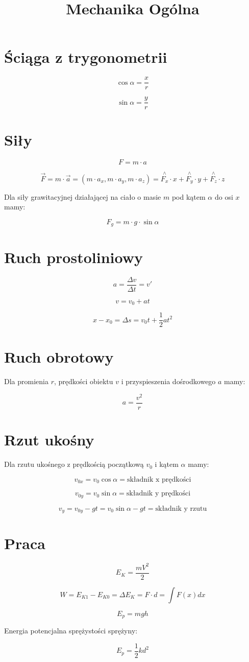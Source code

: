 \documentclass{../notatki}
\title{Mechanika Ogólna}
\begin{document}
\tableofcontents

\section{Ściąga z trygonometrii}

$$
\cos \alpha = \frac{x}{r}
$$

$$
\sin \alpha = \frac{y}{r}
$$

\section{Siły}

$$
F = m \cdot a
$$

$$
\vec{F} = m \cdot \vec{a} = (m \cdot a_x, m \cdot a_y, m \cdot a_z) =
\stackrel{\wedge}{F_x} \cdot x + \stackrel{\wedge}{F_y} \cdot y +
\stackrel{\wedge}{F_z} \cdot z
$$

Dla siły grawitacyjnej działającej na ciało o masie $m$ pod kątem
$\alpha$ do osi $x$ mamy:

$$
F_g = m \cdot g \cdot \sin \alpha
$$

\section{Ruch prostoliniowy}

$$
a = \frac{\Delta v}{\Delta t} = v'
$$

$$
v = v_0 + at
$$

$$
x - x_0 = \Delta s = v_0t + \frac{1}{2}a t^2
$$

\section{Ruch obrotowy}

Dla promienia $r$, prędkości obiektu $v$ i przyspieszenia dośrodkowego $a$ mamy:

$$
a = \frac{v^2}{r}
$$

\section{Rzut ukośny}

Dla rzutu ukośnego z prędkością początkową $v_0$ i kątem $\alpha$ mamy:

$$
v_{0x} = v_0 \cos \alpha = \text{składnik x prędkości}
$$

$$
v_{0y} = v_0 \sin \alpha = \text{składnik y prędkości}
$$

$$
v_y = v_{0y} - gt = v_0 \sin \alpha - gt = \text{składnik y rzutu}
$$

\section{Praca}

$$
E_K = \frac{mV^2}{2}
$$

$$
W = E_{K1} - E_{K0} = \Delta E_K = F \cdot d = \int F(x) dx
$$

$$
E_p = mgh
$$

Energia potencjalna sprężystości sprężyny:

$$
E_p = \frac{1}{2}kd^2
$$
\end{document}
